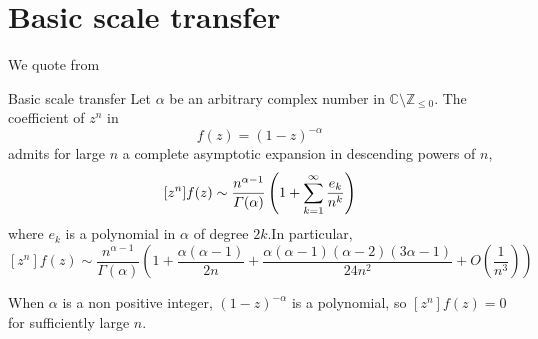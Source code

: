 \documentclass[../main.tex]{subfiles}
\begin{document}
\section{Basic scale transfer}

We quote from \cite{Flajolet2009}

\begin{thm}{Basic scale transfer}
	Let $\alpha$ be an arbitrary complex number in
	$\mathbb{C} \setminus \mathbb{Z}_{\leq 0}$.
	The coefficient of $z^n$ in
	\[
	f(z) = {(1 - z)}^{-\alpha}
	\]
	admits for large $n$ a complete asymptotic expansion in descending powers of $n$,
	\[
	[z^n]f(z) \sim \frac{n^{\alpha - 1}}{\Gamma(\alpha)}
	\left(1 + \sum\limits_{k = 1}^{\infty} \frac{e_k}{n^k} \right)
	\]
	where $e_k$ is a polynomial in $\alpha$ of degree $2k$.In particular,
	\[
	[z^n]f(z) \sim \frac{n^{\alpha - 1}}{\Gamma(\alpha)}
	\left(1 + \frac{\alpha (\alpha - 1)}{2n}
	+ \frac{\alpha (\alpha - 1)(\alpha - 2)(3\alpha - 1)}{24n^2} + O\left( \frac{1}{n^3} \right) \right)
	\]
\end{thm}

\begin{remark}
	When $\alpha$ is a non positive integer, ${(1 - z)}^{-\alpha}$ is a polynomial, so $[z^n]f(z) = 0$ for sufficiently large $n$.
\end{remark}
\end{document}
